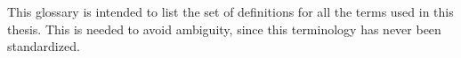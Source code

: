 This glossary is intended to list the set of definitions for all the terms used in this thesis.
This is needed to avoid ambiguity, since this terminology has never been standardized.